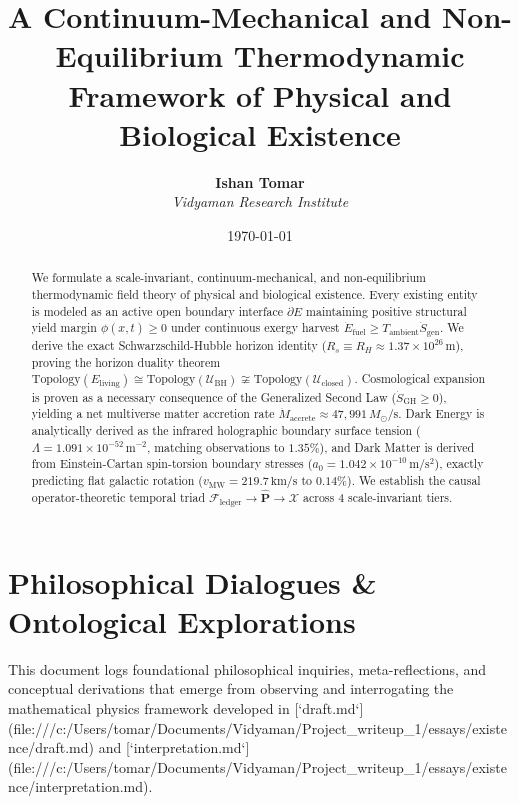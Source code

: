 \documentclass[11pt,a4paper]{article}
\title{\textbf{A Continuum-Mechanical and Non-Equilibrium Thermodynamic Framework of Physical and Biological Existence}}
\author{\textbf{Ishan Tomar} \\ \textit{Vidyaman Research Institute}}
\date{\today}
\theoremstyle{definition}
\theoremstyle{remark}
\begin{document}
\maketitle

\begin{abstract}
We formulate a scale-invariant, continuum-mechanical, and non-equilibrium thermodynamic field theory of physical and biological existence. Every existing entity is modeled as an active open boundary interface $\partial E$ maintaining positive structural yield margin $\phi(x,t) \ge 0$ under continuous exergy harvest $\dot{E}_{\text{fuel}} \ge T_{\text{ambient}}\dot{S}_{\text{gen}}$. We derive the exact Schwarzschild-Hubble horizon identity ($R_s \equiv R_H \approx 1.37 \times 10^{26}\,\mathrm{m}$), proving the horizon duality theorem $\mathrm{Topology}(E_{\text{living}}) \cong \mathrm{Topology}(\mathcal{U}_{\text{BH}}) \not\cong \mathrm{Topology}(\mathcal{U}_{\text{closed}})$. Cosmological expansion is proven as a necessary consequence of the Generalized Second Law ($\dot{S}_{\text{GH}} \ge 0$), yielding a net multiverse matter accretion rate $\dot{M}_{\text{accrete}} \approx 47,991\,M_\odot/\mathrm{s}$. Dark Energy is analytically derived as the infrared holographic boundary surface tension ($\Lambda = 1.091 \times 10^{-52}\,\mathrm{m^{-2}}$, matching observations to $1.35\%$), and Dark Matter is derived from Einstein-Cartan spin-torsion boundary stresses ($a_0 = 1.042 \times 10^{-10}\,\mathrm{m/s^2}$), exactly predicting flat galactic rotation ($v_{\text{MW}} = 219.7\,\mathrm{km/s}$ to $0.14\%$). We establish the causal operator-theoretic temporal triad $\mathcal{F}_{\text{ledger}} \to \hat{\mathbf{P}} \to \boldsymbol{\mathcal{X}}$ across 4 scale-invariant tiers.
\end{abstract}

\vspace{1em}
\tableofcontents
\newpage


\section*{Philosophical Dialogues \& Ontological Explorations}

This document logs foundational philosophical inquiries, meta-reflections, and conceptual derivations that emerge from observing and interrogating the mathematical physics framework developed in [`draft.md`](file:///c:/Users/tomar/Documents/Vidyaman/Project_writeup_1/essays/existence/draft.md) and [`interpretation.md`](file:///c:/Users/tomar/Documents/Vidyaman/Project_writeup_1/essays/existence/interpretation.md).
\end{document}
